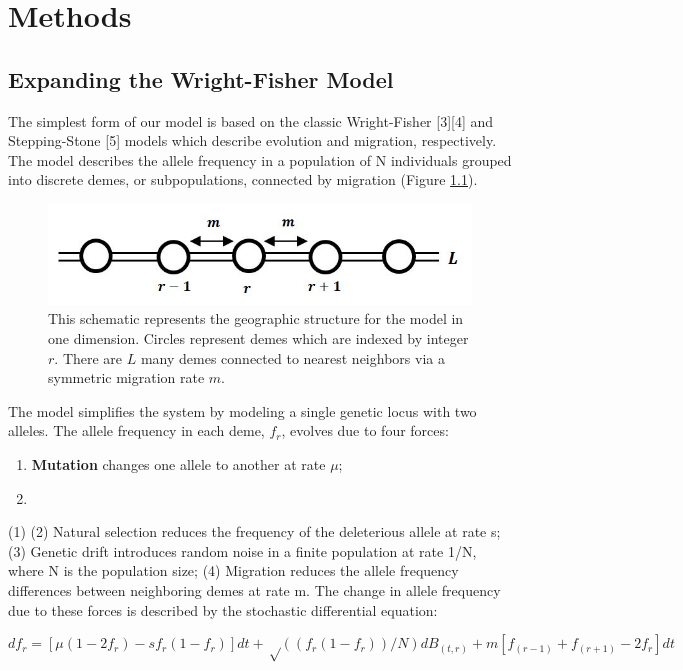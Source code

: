 \chapter{Methods}

\section{Expanding the Wright-Fisher Model}
The simplest form of our model is based on the classic Wright-Fisher [3][4] and Stepping-Stone [5] models which describe evolution and migration, respectively. The model describes the allele frequency in a population of N individuals grouped into discrete demes, or subpopulations, connected by migration (Figure \ref{fig:schematic}). 

\begin{figure}
    \centering
    \includegraphics[scale=0.8]{img/model_schematic.JPG}
    \caption{This schematic represents the geographic structure for the model in one dimension. Circles represent demes which are indexed by integer $r$. There are $L$ many demes connected to nearest neighbors via a symmetric migration rate $m$.}
    \label{fig:schematic}
\end{figure}
	

The model simplifies the system by modeling a single genetic locus with two alleles. The allele frequency in each deme, $f_r$, evolves due to four forces:


\begin{enumerate}
    \item \textbf{Mutation} changes one allele to another at rate $\mu$;
    \item
\end{enumerate}
(1)  (2) Natural selection reduces the frequency of the deleterious allele at rate s; (3) Genetic drift introduces random noise in a finite population at rate 1/N, where N is the population size; (4) Migration reduces the allele frequency differences between neighboring demes at rate m. The change in allele frequency due to these forces is described by the stochastic differential equation:

$$
df_r=[μ(1-2f_r )-sf_r (1-f_r )]dt+√((f_r (1-f_r ))/N) dB_(t,r)+m[f_(r-1)+f_(r+1)-2f_r ]dt
$$

